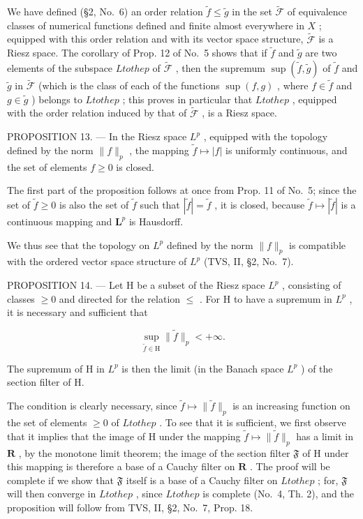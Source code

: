 We have defined (§2, No.~6) an order relation \(\widetilde{f} \leqslant \widetilde{g}\) in the set \(\widetilde{\mathcal{F}}\) of equivalence classes of numerical functions defined and finite almost everywhere in \(X\) ; equipped with this order relation and with its vector space structure, \(\widetilde{\mathcal{F}}\) is a Riesz space. The corollary of Prop. 12 of No.~5 shows that if \(\widetilde{f}\) and \(\widetilde{g}\) are two elements of the subspace \(L to the p\) of \(\widetilde{\mathcal{F}}\) , then the supremum \(\sup (\widetilde{f}, \widetilde{g})\) of \(\widetilde{f}\) and \(\widetilde{g}\) in \(\widetilde{\mathcal{F}}\) (which is the class of each of the functions \(\sup (f, g)\) , where \(f \in \widetilde{f}\) and \(g \in \widetilde{g}\) ) belongs to \(L to the p\) ; this proves in particular that \(L to the p\) , equipped with the order relation induced by that of \(\widetilde{\mathcal{F}}\) , is a Riesz space.

PROPOSITION 13. --- In the Riesz space \(L^{p}\) , equipped with the topology defined by the norm \(\|f\|_{p}\) , the mapping \(\widetilde{f} \mapsto |f|\) is uniformly continuous, and the set of elements \(f \geqslant 0\) is closed.

The first part of the proposition follows at once from Prop. 11 of No.~5; since the set of \(\widetilde{f} \geqslant 0\) is also the set of \(\widetilde{f}\) such that \(|\widetilde{f}| = \widetilde{f}\) , it is closed, because \(\widetilde{f} \mapsto |\widetilde{f}|\) is a continuous mapping and \(\mathbf{L}^p\) is Hausdorff.

We thus see that the topology on \(L^{p}\) defined by the norm \(\|f\|_{p}\) is compatible with the ordered vector space structure of \(L^{p}\) (TVS, II, §2, No.~7).

PROPOSITION 14. --- Let H be a subset of the Riesz space \(L^{p}\) , consisting of classes \(\geqslant 0\) and directed for the relation \(\leqslant\) . For H to have a supremum in \(L^{p}\) , it is necessary and sufficient that

\[
\sup _ {\widetilde {f} \in \mathrm{H}} \| \widetilde {f} \| _ {p} <   + \infty .
\]

The supremum of H in \(L^{p}\) is then the limit (in the Banach space \(L^{p}\) ) of the section filter of H.

The condition is clearly necessary, since \(\widetilde{f} \mapsto \| \widetilde{f} \|_p\) is an increasing function on the set of elements \(\geqslant 0\) of \(L to the p\) . To see that it is sufficient, we first observe that it implies that the image of H under the mapping \(\widetilde{f} \mapsto \| \widetilde{f} \|_p\) has a limit in \(\mathbf{R}\) , by the monotone limit theorem; the image of the section filter \(\mathfrak{F}\) of H under this mapping is therefore a base of a Cauchy filter on \(\mathbf{R}\) . The proof will be complete if we show that \(\mathfrak{F}\) itself is a base of a Cauchy filter on \(L to the p\) ; for, \(\mathfrak{F}\) will then converge in \(L to the p\) , since \(L to the p\) is complete (No.~4, Th. 2), and the proposition will follow from TVS, II, §2, No.~7, Prop. 18.

